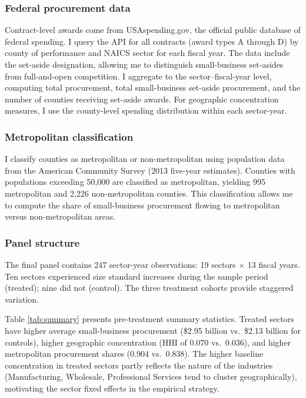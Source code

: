 \documentclass[12pt]{article}
\begin{document}
\subsubsection*{Federal procurement data} Contract-level awards come from USAspending.gov, the official public database of federal spending. I query the API for all contracts (award types A through D) by county of performance and NAICS sector for each fiscal year. The data include the set-aside designation, allowing me to distinguish small-business set-asides from full-and-open competition. I aggregate to the sector--fiscal-year level, computing total procurement, total small-business set-aside procurement, and the number of counties receiving set-aside awards. For geographic concentration measures, I use the county-level spending distribution within each sector-year.

\subsubsection*{Metropolitan classification} I classify counties as metropolitan or non-metropolitan using population data from the American Community Survey (2013 five-year estimates). Counties with populations exceeding 50,000 are classified as metropolitan, yielding 995 metropolitan and 2,226 non-metropolitan counties. This classification allows me to compute the share of small-business procurement flowing to metropolitan versus non-metropolitan areas.

\subsubsection*{Panel structure} The final panel contains 247 sector-year observations: 19 sectors $\times$ 13 fiscal years. Ten sectors experienced size standard increases during the sample period (treated); nine did not (control). The three treatment cohorts provide staggered variation.



Table \ref{tab:summary} presents pre-treatment summary statistics. Treated sectors have higher average small-business procurement (\$2.95 billion vs.\ \$2.13 billion for controls), higher geographic concentration (HHI of 0.070 vs.\ 0.036), and higher metropolitan procurement shares (0.904 vs.\ 0.838). The higher baseline concentration in treated sectors partly reflects the nature of the industries (Manufacturing, Wholesale, Professional Services tend to cluster geographically), motivating the sector fixed effects in the empirical strategy.
\end{document}
